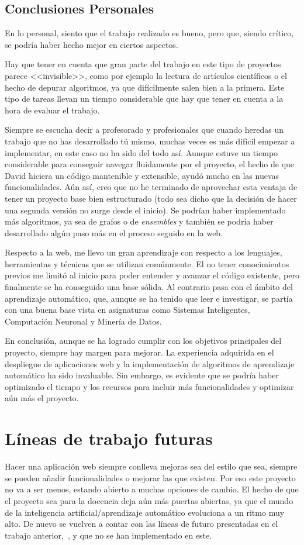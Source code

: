 \subsection{Conclusiones Personales}
En lo personal, siento que el trabajo realizado es bueno, pero que, siendo crítico, se podría haber hecho mejor en ciertos aspectos.

Hay que tener en cuenta que gran parte del trabajo en este tipo de proyectos parece <<invisible>>, como por ejemplo la lectura de artículos científicos o el hecho de depurar algoritmos, ya que difícilmente salen bien a la primera. Este tipo de tareas llevan un tiempo considerable que hay que tener en cuenta a la hora de evaluar el trabajo.

Siempre se escucha decir a profesorado y profesionales que cuando heredas un trabajo que no has desarrollado tú mismo, muchas veces es más difícil empezar a implementar, en este caso no ha sido del todo así. Aunque estuve un tiempo considerable para conseguir navegar fluidamente por el proyecto, el hecho de que David hiciera un código mantenible y extensible, ayudó mucho en las nuevas funcionalidades. Aún así, creo que no he terminado de aprovechar esta ventaja de tener un proyecto base bien estructurado (todo sea dicho que la decisión de hacer una segunda versión no surge desde el inicio). Se podrían haber implementado más algoritmos, ya sea de grafos o de \textit{ensembles} y también se podría haber desarrollado algún paso más en el proceso seguido en la web.

Respecto a la web, me llevo un gran aprendizaje con respecto a los lenguajes, herramientas y técnicas que se utilizan comúnmente. El no tener conocimientos previos me limitó al inicio para poder entender y avanzar el código existente, pero finalmente se ha conseguido una base sólida. Al contrario pasa con el ámbito del aprendizaje automático, que, aunque se ha tenido que leer e investigar, se partía con una buena base vista en asignaturas como Sistemas Inteligentes, Computación Neuronal y Minería de Datos.

En conclusión, aunque se ha logrado cumplir con los objetivos principales del proyecto, siempre hay margen para mejorar. La experiencia adquirida en el despliegue de aplicaciones web y la implementación de algoritmos de aprendizaje automático ha sido invaluable. Sin embargo, es evidente que se podría haber optimizado el tiempo y los recursos para incluir más funcionalidades y optimizar aún más el proyecto.

\section{Líneas de trabajo futuras}
Hacer una aplicación web siempre conlleva mejoras sea del estilo que sea, siempre se pueden añadir funcionalidades o mejorar las que existen. Por eso este proyecto no va a ser menos, estando abierto a muchas opciones de cambio. El hecho de que el proyecto sea para la docencia deja aún más puertas abiertas, ya que el mundo de la inteligencia artificial/aprendizaje automático evoluciona a un ritmo muy alto. De nuevo se vuelven a contar con las líneas de futuro presentadas en el trabajo anterior,~\cite{TFG:David}, y que no se han implementado en este.

